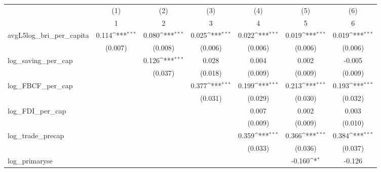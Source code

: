 {
\def\sym#1{\ifmmode^{#1}\else\(^{#1}\)\fi}
\begin{tabular}{l*{6}{c}}
\toprule
            &\multicolumn{1}{c}{(1)}&\multicolumn{1}{c}{(2)}&\multicolumn{1}{c}{(3)}&\multicolumn{1}{c}{(4)}&\multicolumn{1}{c}{(5)}&\multicolumn{1}{c}{(6)}\\
            &\multicolumn{1}{c}{1}&\multicolumn{1}{c}{2}&\multicolumn{1}{c}{3}&\multicolumn{1}{c}{4}&\multicolumn{1}{c}{5}&\multicolumn{1}{c}{6}\\
\midrule
avgL5log\_bri\_per\_capita&       0.114\sym{***}&       0.080\sym{***}&       0.025\sym{***}&       0.022\sym{***}&       0.019\sym{***}&       0.019\sym{***}\\
            &     (0.007)         &     (0.008)         &     (0.006)         &     (0.006)         &     (0.006)         &     (0.006)         \\
\addlinespace
log\_saving\_per\_cap&                     &       0.126\sym{***}&       0.028         &       0.004         &       0.002         &      -0.005         \\
            &                     &     (0.037)         &     (0.018)         &     (0.009)         &     (0.009)         &     (0.009)         \\
\addlinespace
log\_FBCF\_per\_cap&                     &                     &       0.377\sym{***}&       0.199\sym{***}&       0.213\sym{***}&       0.193\sym{***}\\
            &                     &                     &     (0.031)         &     (0.029)         &     (0.030)         &     (0.032)         \\
\addlinespace
log\_FDI\_per\_cap&                     &                     &                     &       0.007         &       0.002         &       0.003         \\
            &                     &                     &                     &     (0.009)         &     (0.009)         &     (0.010)         \\
\addlinespace
log\_trade\_precap&                     &                     &                     &       0.359\sym{***}&       0.366\sym{***}&       0.384\sym{***}\\
            &                     &                     &                     &     (0.033)         &     (0.036)         &     (0.037)         \\
\addlinespace
log\_primaryse&                     &                     &                     &                     &      -0.160\sym{*}  &      -0.126         \\

\end{tabular}}

